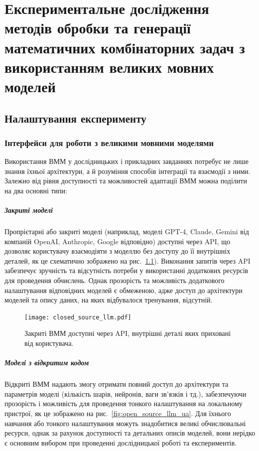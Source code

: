 \chapter{Експериментальне дослідження методів обробки та генерації математичних комбінаторних задач з використанням великих мовних моделей}

\section{Налаштування експерименту}

\subsection{Інтерфейси для роботи з великими мовними моделями}

Використання ВММ у дослідницьких і прикладних завданнях потребує не лише знання їхньої архітектури, а й розуміння способів інтеграції та взаємодії з ними. Залежно від рівня доступності та можливостей адаптації ВММ можна поділити на два основні типи:

\paragraph{Закриті моделі}

Пропрієтарні або закриті моделі (наприклад, моделі GPT-4, Claude, Gemini від компаній OpenAI, Anthropic, Google відповідно) доступні через API, що дозволяє користувачу взаємодіяти з моделлю без доступу до її внутрішніх деталей, як це схематично зображено на рис.~\ref{fig:closed_source_llm_ua}). Виконання запитів через API забезпечує зручність та відсутність потреби у використанні додаткових ресурсів для проведення обчислень. Однак прозорість та можливість додаткового налаштування відповідних моделей є обмеженою, адже доступ до архітектури моделей та опису даних, на яких відбувалося тренування, відсутній.

\begin{figure}[h]
    \centering
    \texttt{[image: closed\_source\_llm.pdf]}
    \caption{Закриті ВММ доступні через API, внутрішні деталі яких приховані від користувача.}
    \label{fig:closed_source_llm_ua}
\end{figure}

\paragraph{Моделі з відкритим кодом}

Відкриті ВММ надають змогу отримати повний доступ до архітектури та параметрів моделі (кількість шарів, нейронів, ваги зв'язків і тд.), забезпечуючи прозорість і можливість для проведення тонкого налаштування на локальному пристрої, як це зображено на рис.~\ref{fig:open_source_llm_ua}. Для їхнього навчання або тонкого налаштування можуть знадобитися великі обчислювальні ресурси, однак за рахунок доступності та детальних описів моделей, вони нерідко є основним вибором при проведенні дослідницької роботі та експериментів.

